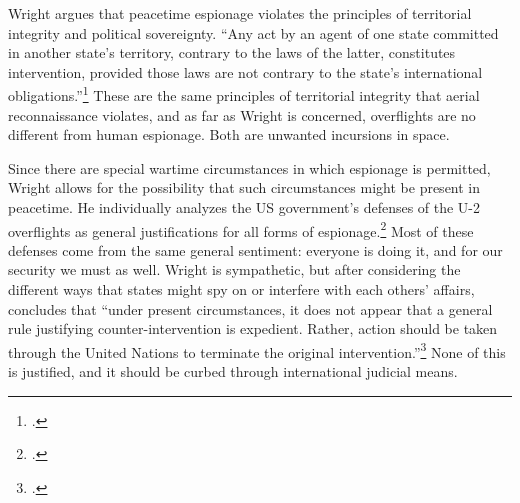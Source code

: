 \documentclass{memoir}
\begin{document}
\begin{refsegment}
Wright argues that peacetime espionage violates the principles of territorial integrity and political sovereignty. ``Any act by an agent of one state committed in another state's territory, contrary to the laws of the latter, constitutes intervention, provided those laws are not contrary to the state's international obligations.''\footcite[p.~13]{wright_espionage_1962} These are the same principles of territorial integrity that aerial reconnaissance violates, and as far as Wright is concerned, overflights are no different from human espionage. Both are unwanted incursions in space.

Since there are special wartime circumstances in which espionage is permitted, Wright allows for the possibility that such circumstances might be present in peacetime. He individually analyzes the US government's defenses of the U-2 overflights as general justifications for all forms of espionage.\footcite[p.~17. A fun question to ask yourself is whether putting human spies and overflights in the same category elevates the severity of human intelligence or minimizes that of overflights. I think it actually does both, and Wright seems to agree. An overflying plane is clearly capable of greater physical destruction but ``the difference should not be exaggerated. Although a reconnaissance airplane may carry bombs, a secret agent may plant a bomb and engage in various forms of sabotage.'' (p. 21) The general lack of concern that a spy plane might be carrying bombs is consistently surprising to me. Many of these flights were in retrofitted bombers, completely indistinguishable to enemies from their heavily-armed counterparts. Nonethless, both sides seem willing to treat reconnaissance flights as their own separate thing, and that protection applies to spies as well. As long as spies \emph{don't} engage in sabotage, the fact that they have the potential to do so is irrelevant.]{wright_espionage_1962} Most of these defenses come from the same general sentiment: everyone is doing it, and for our security we must as well. Wright is sympathetic, but after considering the different ways that states might spy on or interfere with each others' affairs, concludes that ``under present circumstances, it does not appear that a general rule justifying counter-intervention is expedient. Rather, action should be taken through the United Nations to terminate the original intervention.''\footcite[p.~22]{wright_espionage_1962} None of this is justified, and it should be curbed through international judicial means.



\end{refsegment}
\end{document}
